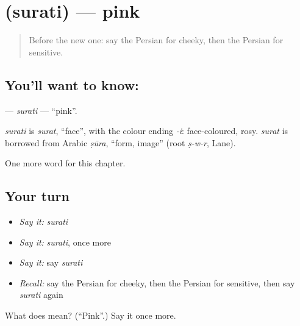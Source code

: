 \section[\texorpdfstring{\fa{صورتی} (surati)}{صورتی (surati)}]{ (surati) — pink}

\label{lesson:FA-C272-surati}



\begin{quote}
Before the new one: say the Persian for cheeky, then the Persian for sensitive.
\end{quote}

\subsection*{You'll want to know: }
\textbf{} — \emph{surati} — \textquotedblleft{}pink\textquotedblright{}.

\begin{cousinweb}
\emph{surati} is \emph{surat}, \textquotedblleft{}face\textquotedblright{}, with the colour ending \emph{-i}: face-coloured, rosy. \emph{surat} is borrowed from Arabic \emph{ṣūra}, \textquotedblleft{}form, image\textquotedblright{} (root \emph{ṣ-w-r}, Lane).
\end{cousinweb}

\begin{grammarlens}[title={What you've built}]
One more word for this chapter.
\end{grammarlens}

\subsection*{Your turn}
\begin{itemize}
\raggedright
  \item \emph{Say it:} \emph{surati}
  \item \emph{Say it:} \emph{surati}, once more
  \item \emph{Say it:} say \emph{surati}
  \item \emph{Recall:} say the Persian for cheeky, then the Persian for sensitive, then say \emph{surati} again
\end{itemize}

\begin{tcolorbox}[breakable,colback=teal!4,colframe=teal!35!black,title={Before you move on}]
What does  mean? (\textquotedblleft{}Pink\textquotedblright{}.) Say it once more.
\end{tcolorbox}
